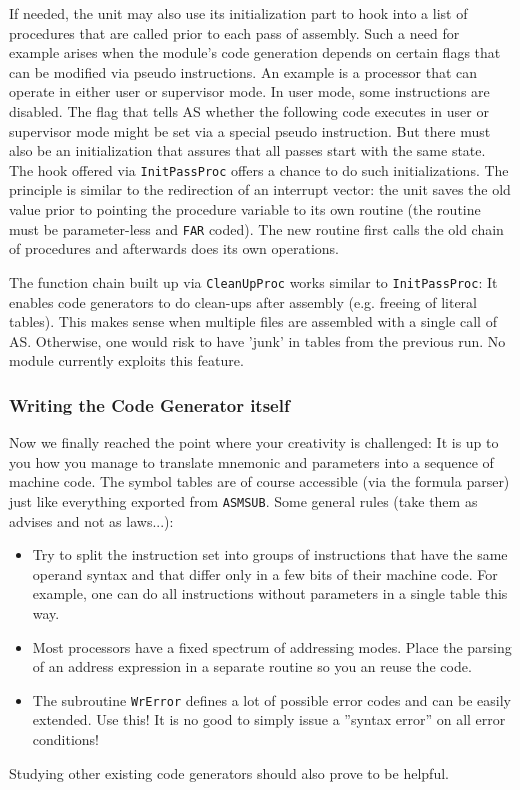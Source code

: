 \documentclass[12pt,twoside]{report}
\newcommand{\tty}[1]{{\tt #1}}
\begin{document}
If needed, the unit may also use its initialization part to hook into
a list of procedures that are called prior to each pass of assembly.
Such a need for example arises when the module's code generation
depends on certain flags that can be modified via pseudo
instructions.  An example is a processor that can operate in either
user or supervisor mode.  In user mode, some instructions are
disabled.  The flag that tells AS whether the following code executes
in user or supervisor mode might be set via a special pseudo
instruction.  But there must also be an initialization that assures
that all passes start with the same state.  The hook offered via
\tty{InitPassProc} offers a chance to do such initializations.  The
principle is similar to the redirection of an interrupt vector: the
unit saves the old value prior to pointing the procedure variable to
its own routine (the routine must be parameter-less and \tty{FAR} coded).
The new routine first calls the old chain of procedures and
afterwards does its own operations.

The function chain built up via \tty{CleanUpProc} works similar to
\tty{InitPassProc}: It enables code generators to do clean-ups after
assembly (e.g. freeing of literal tables).  This makes sense when
multiple files are assembled with a single call of AS.  Otherwise,  one
would risk to have 'junk' in tables from the previous run.  No module
currently exploits this feature.

\subsubsection{Writing the Code Generator itself}

Now we finally reached the point where your creativity is challenged:
It is up to you how you manage to translate mnemonic and parameters
into a sequence of machine code.  The symbol tables are of course
accessible (via the formula parser) just like everything exported
from \tty{ASMSUB}.  Some general rules (take them as advises and not as
laws...):
\begin{itemize}
\item{Try to split the instruction set into groups of instructions that
      have the same operand syntax and that differ only in a few bits
      of their machine code.  For example, one can do all instructions
      without parameters in a single table this way.}
\item{Most processors have a fixed spectrum of addressing modes.  Place
      the parsing of an address expression in a separate routine so you
      an reuse the code.}
\item{The subroutine \tty{WrError} defines a lot of possible error codes and
      can be easily extended.  Use this!  It is no good to simply issue
      a ''syntax error'' on all error conditions!}
\end{itemize}
Studying other existing code generators should also prove to be
helpful.
\end{document}
